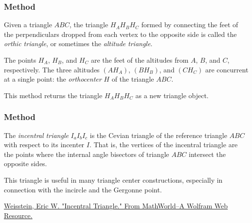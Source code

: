 \subsubsection{Method }
\label{ssub:method_triangle_orthic}

Given a triangle $ABC$, the triangle $H_AH_BH_C$ formed by connecting the feet of the perpendiculars dropped from each vertex to the opposite side is called the \emph{orthic triangle}, or sometimes the \emph{altitude triangle}.

The points $H_A$, $H_B$, and $H_C$ are the feet of the altitudes from $A$, $B$, and $C$, respectively. The three altitudes $(AH_A)$, $(BH_B)$, and $(CH_C)$ are concurrent at a single point: the \emph{orthocenter} $H$ of the triangle $ABC$.

This method returns the triangle $H_AH_BH_C$ as a new triangle object.

\vspace{1em}

\begin{tkzexample}[latex=8cm]
\end{tkzexample}

\subsubsection{Method }
\label{ssub:method_incentral}

The \emph{incentral triangle} $I_aI_bI_c$ is the Cevian triangle of the reference triangle $ABC$ with respect to its incenter $I$. That is, the vertices of the incentral triangle are the points where the internal angle bisectors of triangle $ABC$ intersect the opposite sides.

This triangle is useful in many triangle center constructions, especially in connection with the incircle and the Gergonne point.\begin{flushright}
  \small
\href{https://mathworld.wolfram.com/IncentralTriangle.html}{Weisstein, Eric W. "Incentral Triangle." From MathWorld--A Wolfram Web Resource.}
\end{flushright}

